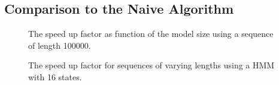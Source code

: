 \subsection{Comparison to the Naive Algorithm}
\label{sec:comp-naive-algor}

\begin{figure}[H]
  \centering
  
  \caption{The speed up factor as function of the model size using a sequence
    of length 100000.}
  \label{fig:posterior_speedup_vs_k}
\end{figure}

\begin{figure}[H]
  \centering
  
  \caption{The speed up factor for sequences of varying lengths using a HMM
    with 16 states.}
  \label{fig:posterior_speedup_vs_sequence_length}
\end{figure}

